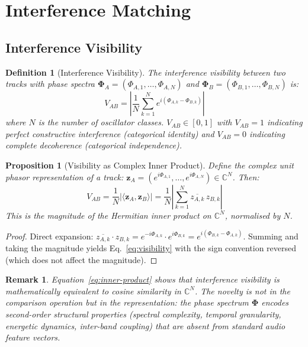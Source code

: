 \documentclass[11pt,twocolumn,a4paper]{article}
\newtheorem{proposition}[theorem]{Proposition}
\newtheorem{definition}[theorem]{Definition}
\newtheorem{remark}[theorem]{Remark}
\newcommand{\CC}{\mathbb{C}}
\newcommand{\Spec}{\bm{\Phi}}
\begin{document}
\section{Interference Matching}
\label{sec:interference}

\subsection{Interference Visibility}

\begin{definition}[Interference Visibility]
\label{def:visibility}
The interference visibility between two tracks with phase spectra
$\Spec_A = (\Phi_{A,1}, \ldots, \Phi_{A,N})$ and
$\Spec_B = (\Phi_{B,1}, \ldots, \Phi_{B,N})$ is:
\begin{equation}
  V_{AB} = \left|\frac{1}{N} \sum_{k=1}^{N}
  e^{i(\Phi_{A,k} - \Phi_{B,k})}\right|
  \label{eq:visibility}
\end{equation}
where $N$ is the number of oscillator classes. $V_{AB} \in [0, 1]$
with $V_{AB} = 1$ indicating perfect constructive interference
(categorical identity) and $V_{AB} = 0$ indicating complete
decoherence (categorical independence).
\end{definition}

\begin{proposition}[Visibility as Complex Inner Product]
\label{prop:inner-product}
Define the complex unit phasor representation of a track:
$\mathbf{z}_A = (e^{i\Phi_{A,1}}, \ldots, e^{i\Phi_{A,N}}) \in
\CC^N$. Then:
\begin{equation}
  V_{AB} = \frac{1}{N}
  \bigl|\langle \mathbf{z}_A, \mathbf{z}_B \rangle\bigr|
  = \frac{1}{N}
  \left|\sum_{k=1}^{N} \overline{z_{A,k}}\, z_{B,k}\right|
  \label{eq:inner-product}
\end{equation}
This is the magnitude of the Hermitian inner product on $\CC^N$,
normalised by $N$.
\end{proposition}

\begin{proof}
Direct expansion: $\overline{z_{A,k}} \cdot z_{B,k} =
e^{-i\Phi_{A,k}} \cdot e^{i\Phi_{B,k}} = e^{i(\Phi_{B,k} -
\Phi_{A,k})}$. Summing and taking the magnitude yields
Eq.~\eqref{eq:visibility} with the sign convention reversed (which
does not affect the magnitude).
\end{proof}

\begin{remark}
Equation~\eqref{eq:inner-product} shows that interference visibility
is mathematically equivalent to cosine similarity in $\CC^N$. The
novelty is not in the comparison operation but in the
\emph{representation}: the phase spectrum $\Spec$ encodes
second-order structural properties (spectral complexity, temporal
granularity, energetic dynamics, inter-band coupling) that are absent
from standard audio feature vectors.
\end{remark}
\end{document}
